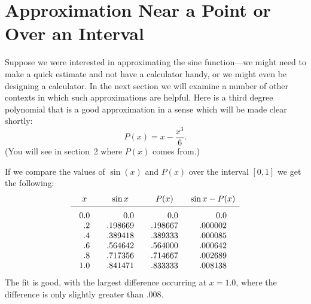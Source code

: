 \section{Approximation Near a Point or\\ Over an Interval}
\label{sec:approximation-near-a-point-or-over-an-interval}

Suppose we were interested in approximating the sine function---we
might need to make a quick estimate and not have a calculator handy,
or we might even be designing a calculator.  In the next section we
will examine a number of other contexts in which such approximations
are helpful.  Here is a third degree polynomial that is a good
approximation in a sense which will be made clear shortly:
\[
P(x) = x - \dfrac{x^3}{6}.
\]
(You will see in section~2 where $P(x)$ comes from.)

If we compare the values of $\sin(x)$ and $P(x)$ over the interval
$[0, 1]$ we get the following:
\[
\begin{array}{cccc}
        x  & \sin{x} & P(x) &\sin{x}-P(x)\\ [2pt] \hline
        \begin{array}{r}
        \rule{0pt}{14pt} 0.0\\ .2 \\ .4 \\ .6 \\ .8 \\ 1.0 
        \end{array}
        &
        \begin{array}{r}
        \rule{0pt}{14pt} 0.0 \\ .198669 \\ .389418 \\ .564642 \\ .717356 \\ .841471  
        \end{array}
        &
        \begin{array}{r}
        \rule{0pt}{14pt} 0.0 \\ .198667 \\ .389333 \\ .564000 \\ .714667 \\ .833333
        \end{array}
        &
        \begin{array}{r}
        \rule{0pt}{14pt} 0.0 \\ .000002 \\ .000085 \\ .000642 \\ .002689 \\ .008138  
        \end{array}
\end{array}
\]
The fit is good, with the largest difference occurring at $x=1.0$,
where the difference is only slightly greater than $.008$.

